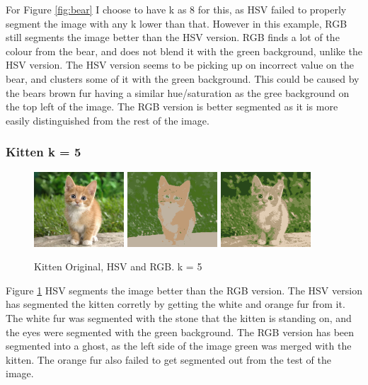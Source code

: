 \documentclass{article}
\begin{document}
For Figure \ref{fig:bear} I choose to have k as 8 for this, as HSV failed to
properly segment the image with any k lower than that. However in this example,
RGB still segments the image better than the HSV version. RGB finds a lot of the
colour from the bear, and does not blend it with the green background, unlike
the HSV version. The HSV version seems to be picking up on incorrect value on
the bear, and clusters some of it with the green background. This could be
caused by the bears brown fur having a similar hue/saturation as the gree
background on the top left of the image. The RGB version is better segmented as
it is more easily distinguished from the rest of the image.

\subsubsection{Kitten k = 5}

\begin{figure}[!ht]
\begin{center}
\includegraphics[width=0.3\textwidth]{images/kitten}
\includegraphics[width=0.3\textwidth]{images/hsv_5_kitten}
\includegraphics[width=0.3\textwidth]{images/rgb_5_kitten}
\caption{Kitten Original, HSV and RGB. k = 5}
\label{fig:kitten}
\end{center}
\end{figure}

Figure \ref{fig:kitten} HSV segments the image better than the RGB version. The
HSV version has segmented the kitten corretly by getting the white and orange
fur from it. The white fur was segmented with the stone that the kitten is
standing on, and the eyes were segmented with the green background. The RGB
version has been segmented into a ghost, as the left side of the image green was
merged with the kitten. The orange fur also failed to get segmented out from the
test of the image.
\end{document}
